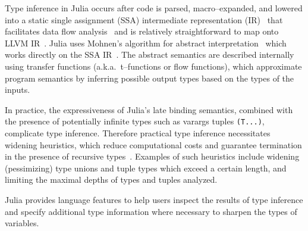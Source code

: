 \documentclass[pldi]{sigplanconf-pldi15}
\begin{document}
Type inference in Julia occurs after code is parsed, macro--expanded, and
lowered into a static single assignment (SSA) intermediate representation
(IR)~\cite{Alpern1988,Rosen1988} that facilitates data flow
analysis~\cite{Cousot1977,Cousot2000,Nielson2005} and is relatively
straightforward to map onto LLVM IR~\cite{Lattner2004}. Julia uses Mohnen's algorithm
for abstract interpretation~\cite{Cousot1992} which works directly on the SSA
IR~\cite{Mohnen2002}. The abstract semantics are described internally using
transfer functions (a.k.a.\ t--functions or flow functions), which approximate
program semantics by inferring possible output types based on the types of
the inputs.

In practice, the expressiveness of Julia's late binding semantics, combined
with the presence of potentially infinite types such as varargs tuples
\verb|(T...)|, complicate type inference.
Therefore practical type inference necessitates
widening heuristics, which reduce computational costs and guarantee termination
in the presence of recursive types~\cite{Cousot1992a}. Examples of such
heuristics include widening (pessimizing) type unions and tuple types which
exceed a certain length, and limiting the maximal depths of types
and tuples analyzed.

Julia provides language features to help users inspect the results of type
inference and specify additional type information where necessary to sharpen
the types of variables.
\end{document}
